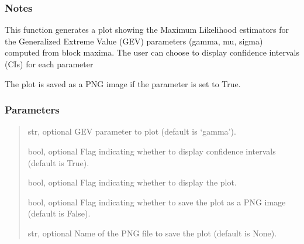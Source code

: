 \documentclass[a4paper,11pt,openany,english]{sphinxmanual}
\begin{document}
\begin{fulllineitems}
\begin{fulllineitems}
\subsubsection{Notes}
\label{\detokenize{api_topt:id60}}
\sphinxAtStartPar
This function generates a plot showing the Maximum Likelihood estimators for the Generalized Extreme Value (GEV) parameters 
(gamma, mu, sigma) computed from block maxima. The user can choose to display confidence intervals (CIs) for each parameter

\sphinxAtStartPar
The plot is saved as a PNG image if the  parameter is set to True.


\subsubsection{Parameters}
\label{\detokenize{api_topt:id61}}\begin{quote}\begin{description}
\sphinxAtStartPar
str, optional
GEV parameter to plot (default is ‘gamma’).

\sphinxAtStartPar
bool, optional
Flag indicating whether to display confidence intervals (default is True).

\sphinxAtStartPar
bool, optional
Flag indicating whether to display the plot.

\sphinxAtStartPar
bool, optional
Flag indicating whether to save the plot as a PNG image (default is False).

\sphinxAtStartPar
str, optional
Name of the PNG file to save the plot (default is None).

\end{description}\end{quote}



\end{fulllineitems}
\end{fulllineitems}
\end{document}

